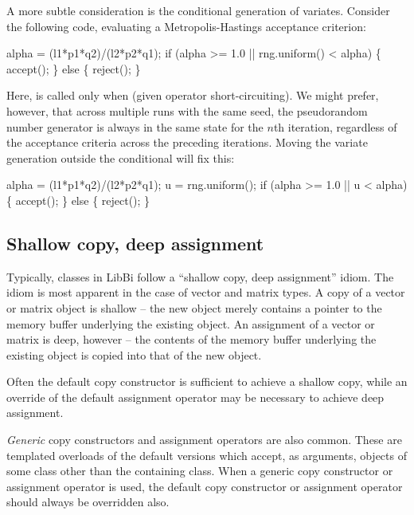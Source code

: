 A more subtle consideration is the conditional generation of
variates. Consider the following code, evaluating a
Metropolis-Hastings acceptance criterion:
\begin{cppcode}
alpha = (l1*p1*q2)/(l2*p2*q1);
if (alpha >= 1.0 || rng.uniform() < alpha) \{
  accept();
\} else \{
  reject();
\}
\end{cppcode}
Here,  is called only when  (given
operator short-circuiting). We might prefer, however, that across multiple
runs with the same seed, the pseudorandom number generator is always in the
same state for the $n$th iteration, regardless of the acceptance criteria
across the preceding iterations. Moving the variate generation outside the
conditional will fix this:
\begin{cppcode}
alpha = (l1*p1*q2)/(l2*p2*q1);
u = rng.uniform();
if (alpha >= 1.0 || u < alpha) \{
  accept();
\} else \{
  reject();
\}
\end{cppcode}

\subsection{Shallow copy, deep assignment}

Typically, classes in LibBi follow a ``shallow copy, deep assignment''
idiom. The idiom is most apparent in the case of vector and matrix types. A
copy of a vector or matrix object is shallow -- the new object merely contains
a pointer to the memory buffer underlying the existing object. An assignment
of a vector or matrix is deep, however -- the contents of the memory buffer
underlying the existing object is copied into that of the new object.

Often the default copy constructor is sufficient to achieve a shallow copy,
while an override of the default assignment operator may be necessary to
achieve deep assignment.

\emph{Generic} copy constructors and assignment operators are also
common. These are templated overloads of the default versions which accept, as
arguments, objects of some class other than the containing class. When a
generic copy constructor or assignment operator is used, the default copy
constructor or assignment operator should always be overridden also.

